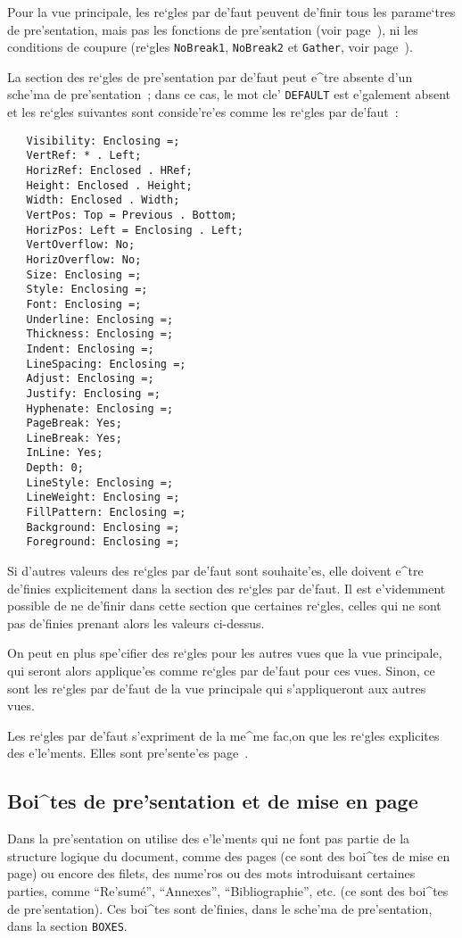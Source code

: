 {Pour la vue principale, les re`gles par de'faut peuvent de'finir tous les
parame`tres de pre'sentation, mais pas les fonctions de pre'sentation (voir
page~\pageref{fonctpres}), ni les conditions de coupure (re`gles
{\tt NoBreak1}, {\tt NoBreak2} et {\tt Gather}, voir
page~\pageref{condcoupure}).

La section des re`gles de pre'sentation par de'faut peut e^tre absente d'un
sche'ma de pre'sentation~; dans ce cas, le mot cle' {\tt DEFAULT} est
e'galement absent et les re`gles suivantes sont conside're'es comme les
re`gles par de'faut~:

\begin{verbatim}
   Visibility: Enclosing =;
   VertRef: * . Left;
   HorizRef: Enclosed . HRef;
   Height: Enclosed . Height;
   Width: Enclosed . Width;
   VertPos: Top = Previous . Bottom;
   HorizPos: Left = Enclosing . Left;
   VertOverflow: No;
   HorizOverflow: No;
   Size: Enclosing =;
   Style: Enclosing =;
   Font: Enclosing =;
   Underline: Enclosing =;
   Thickness: Enclosing =;
   Indent: Enclosing =;
   LineSpacing: Enclosing =;
   Adjust: Enclosing =;
   Justify: Enclosing =;
   Hyphenate: Enclosing =;
   PageBreak: Yes;
   LineBreak: Yes;
   InLine: Yes;
   Depth: 0;
   LineStyle: Enclosing =;
   LineWeight: Enclosing =;
   FillPattern: Enclosing =;
   Background: Enclosing =;
   Foreground: Enclosing =;
\end{verbatim}

Si d'autres valeurs des re`gles par de'faut sont souhaite'es, elle doivent
e^tre de'finies explicitement dans la section des re`gles par de'faut. Il est
e'videmment possible de ne de'finir dans cette section que certaines re`gles,
celles qui ne sont pas de'finies prenant alors les valeurs ci-dessus.

On peut en plus spe'cifier des re`gles pour les autres vues que la vue
principale, qui seront alors applique'es comme re`gles par de'faut pour ces
vues. Sinon, ce sont les re`gles par de'faut de la vue principale qui
s'appliqueront aux autres vues.

Les re`gles par de'faut s'expriment de la me^me fac,on que les re`gles
explicites des e'le'ments. Elles sont pre'sente'es page~\pageref{reglepres}.

\subsection{Boi^tes de pre'sentation et de mise en page}

Dans la pre'sentation on utilise des e'le'ments qui ne font pas partie de la
structure logique du document, comme des pages (ce sont des
boi^tes de mise en page) ou encore des filets, des nume'ros ou des mots
introduisant certaines parties, comme ``Re'sum\'{e}'', ``Annexes'',
``Bibliographie'', etc. (ce sont des boi^tes de pre'sentation). Ces boi^tes
sont de'finies, dans le sche'ma de pre'sentation, dans la section {\tt BOXES}.

}
